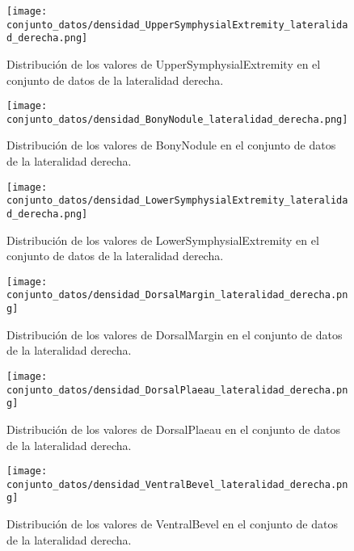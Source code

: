 \begin{figure}[H]
	\centering
	\texttt{[image: conjunto\_datos/densidad\_UpperSymphysialExtremity\_lateralidad\_derecha.png]}
	\caption{Distribución de los valores de UpperSymphysialExtremity en el conjunto de datos de la lateralidad derecha.}
	\label{fig:densidad_UpperSymphysialExtremity_lateralidad_derecha}
\end{figure}


\begin{figure}[H]
	\centering
	\texttt{[image: conjunto\_datos/densidad\_BonyNodule\_lateralidad\_derecha.png]}
	\caption{Distribución de los valores de BonyNodule en el conjunto de datos de la lateralidad derecha.}
	\label{fig:densidad_BonyNodule_lateralidad_derecha}
\end{figure}



\begin{figure}[H]
	\centering
	\texttt{[image: conjunto\_datos/densidad\_LowerSymphysialExtremity\_lateralidad\_derecha.png]}
	\caption{Distribución de los valores de LowerSymphysialExtremity en el conjunto de datos de la lateralidad derecha.}
	\label{fig:densidad_LowerSymphysialExtremity_derecha}
\end{figure}


\begin{figure}[H]
	\centering
	\texttt{[image: conjunto\_datos/densidad\_DorsalMargin\_lateralidad\_derecha.png]}
	\caption{Distribución de los valores de DorsalMargin en el conjunto de datos de la lateralidad derecha.}
	\label{fig:densidad_DorsalMargin_derecha}
\end{figure}

\begin{figure}[H]
	\centering
	\texttt{[image: conjunto\_datos/densidad\_DorsalPlaeau\_lateralidad\_derecha.png]}
	\caption{Distribución de los valores de DorsalPlaeau en el conjunto de datos de la lateralidad derecha.}
	\label{fig:densidad_DorsalPlaeau_derecha}
\end{figure}


\begin{figure}[H]
	\centering
	\texttt{[image: conjunto\_datos/densidad\_VentralBevel\_lateralidad\_derecha.png]}
	\caption{Distribución de los valores de VentralBevel en el conjunto de datos de la lateralidad derecha.}
	\label{fig:densidad_VentralBevel_derecha}
\end{figure}

